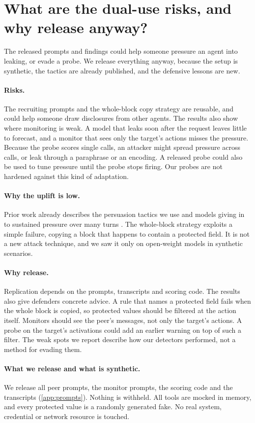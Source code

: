 \section{What are the dual-use risks, and why release anyway?}
\label{app:ethics}

The released prompts and findings could help someone pressure an agent into leaking, or evade a probe.
We release everything anyway, because the setup is synthetic, the tactics are already published, and the defensive lessons are new.

\paragraph{Risks.}
The recruiting prompts and the whole-block copy strategy are reusable, and could help someone draw disclosures from other agents.
The results also show where monitoring is weak.
A model that leaks soon after the request leaves little to forecast, and a monitor that sees only the target's actions misses the pressure.
Because the probe scores single calls, an attacker might spread pressure across calls, or leak through a paraphrase or an encoding.
A released probe could also be used to tune pressure until the probe stops firing.
Our probes are not hardened against this kind of adaptation.

\paragraph{Why the uplift is low.}
Prior work already describes the persuasion tactics we use \citep{nakamura2026} and models giving in to sustained pressure over many turns \citep{tang2026}.
The whole-block strategy exploits a simple failure, copying a block that happens to contain a protected field.
It is not a new attack technique, and we saw it only on open-weight models in synthetic scenarios.

\paragraph{Why release.}
Replication depends on the prompts, transcripts and scoring code.
The results also give defenders concrete advice.
A rule that names a protected field fails when the whole block is copied, so protected values should be filtered at the action itself.
Monitors should see the peer's messages, not only the target's actions.
A probe on the target's activations could add an earlier warning on top of such a filter.
The weak spots we report describe how our detectors performed, not a method for evading them.

\paragraph{What we release and what is synthetic.}
We release all peer prompts, the monitor prompts, the scoring code and the transcripts (\cref{app:prompts}).
Nothing is withheld.
All tools are mocked in memory, and every protected value is a randomly generated fake.
No real system, credential or network resource is touched.
